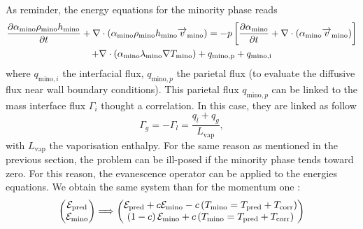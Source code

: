 As reminder, the energy equations for the minority phase reads
\begin{multline}
    \label{eq:eva_energy}
    \frac{\partial \alpha_{\text{mino}} \rho_{\text{mino}} h_{\text{mino}}}{\partial t}+\nabla \cdot\left(\alpha_{\text{mino}} \rho_{\text{mino}} h_{\text{mino}} \vec{v}_{\text{\text{mino}}}\right)=-p\left[\frac{\partial \alpha_{\text{mino}}}{\partial t} +\nabla \cdot\left(\alpha_{\text{mino}} \vec{v}_{\text{mino}}\right)\right] \\
    +\nabla \cdot\left(\alpha_{\text{mino}} \lambda_{\text{mino}} \nabla T_{\text{mino}}\right)+q_{\text{mino,p}}+q_{\text{mino,i}}
\end{multline}
where $q_{\text{mino},i}$ the interfacial flux, $q_{\text{mino},p}$ the parietal flux (to evaluate the diffusive flux near wall boundary conditions). This parietal flux $q_{\text{mino},p}$ can be linked to the mass interface flux $\Gamma_i$ thought a correlation. In this case, they are linked as follow
\begin{equation}
    \Gamma_g = -\Gamma_l = \frac{q_{l} + q_{g}}{L_{\text{vap}}},
\end{equation}
with $L_{\text{vap}}$ the vaporisation enthalpy. For the same reason as mentioned in the previous section, the problem can be ill-posed if the minority phase tends toward zero. For this reason, the evanescence operator can be applied to the energies equations. We obtain the same system than for the momentum one :
\begin{equation}
\label{eq:evanescence_nrj}
\begin{pmatrix}
{\mathcal{E}_{\text{pred}}}  \\
{\mathcal{E}_{\text{mino}}}
\end{pmatrix}
\Longrightarrow
\begin{pmatrix}
{\mathcal{E}_{\text{pred}}} + c {\mathcal{E}_{\text{mino}}} - c \parent{T_{\text{mino}}=T_{\text{pred}}+T_{\text{corr}}} \\
\parent{1 - c} {\mathcal{E}_{\text{mino}}} + c \parent{T_{\text{mino}}=T_{\text{pred}}+T_{\text{corr}}}
\end{pmatrix}
\end{equation}


